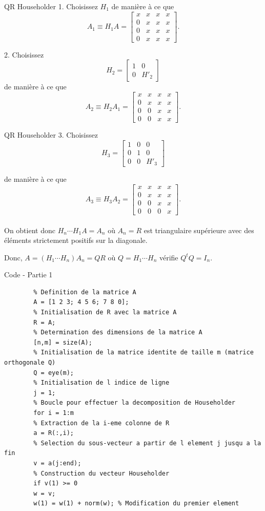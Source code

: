 \documentclass[french, 10pt]{beamer}
\theoremstyle{definition}
\begin{document}
\begin{frame}{QR Householder}
	1. Choisissez \( H_1 \) de manière à ce que  
	\[
	A_1 \equiv H_1 A =
	\begin{bmatrix}
		x & x & x & x \\
		0 & x & x & x \\
		0 & x & x & x \\
		0 & x & x & x
	\end{bmatrix}.
	\]
	
	2. Choisissez  
	\[
	H_2 =
	\begin{bmatrix}
		1 & 0 \\
		0 & H'_2
	\end{bmatrix}
	\]
	de manière à ce que  
	\[
	A_2 \equiv H_2 A_1 =
	\begin{bmatrix}
		x & x & x & x \\
		0 & x & x & x \\
		0 & 0 & x & x \\
		0 & 0 & x & x
	\end{bmatrix}.
	\]
	
\end{frame}


\begin{frame}{QR Householder}
	3. Choisissez  
	\[
	H_3 =
	\begin{bmatrix}
		1 & 0 & 0 \\
		0 & 1 & 0\\
		0& 0 & H'_3
	\end{bmatrix}
	\]
	
	de manière à ce que  
	\[
	A_3 \equiv H_3 A_2 =
	\begin{bmatrix}
		x & x & x & x \\
		0 & x & x & x \\
		0 & 0 & x & x \\
		0 & 0 & 0 & x
	\end{bmatrix}.
	\]
	\\
	On obtient donc $H_n \cdots H_1 A = A_n$ où $A_n = R$ est triangulaire supérieure avec des éléments strictement positifs sur la diagonale.
	
	Donc, $A = (H_1 \cdots H_n) A_n = QR$ où $Q = H_1 \cdots H_n$ vérifie $Q^t Q = I_n$.
	
\end{frame}
\begin{frame}[fragile]{Code - Partie 1}
	\begin{lstlisting}
		% Definition de la matrice A
		A = [1 2 3; 4 5 6; 7 8 0];
		% Initialisation de R avec la matrice A
		R = A;
		% Determination des dimensions de la matrice A
		[n,m] = size(A);
		% Initialisation de la matrice identite de taille m (matrice orthogonale Q)
		Q = eye(m);
		% Initialisation de l indice de ligne
		j = 1;
		% Boucle pour effectuer la decomposition de Householder
		for i = 1:m
		% Extraction de la i-eme colonne de R
		a = R(:,i);
		% Selection du sous-vecteur a partir de l element j jusqu a la fin
		v = a(j:end);
		% Construction du vecteur Householder
		if v(1) >= 0
		w = v;
		w(1) = w(1) + norm(w); % Modification du premier element
		
		
	\end{lstlisting}
\end{frame}
\end{document}
